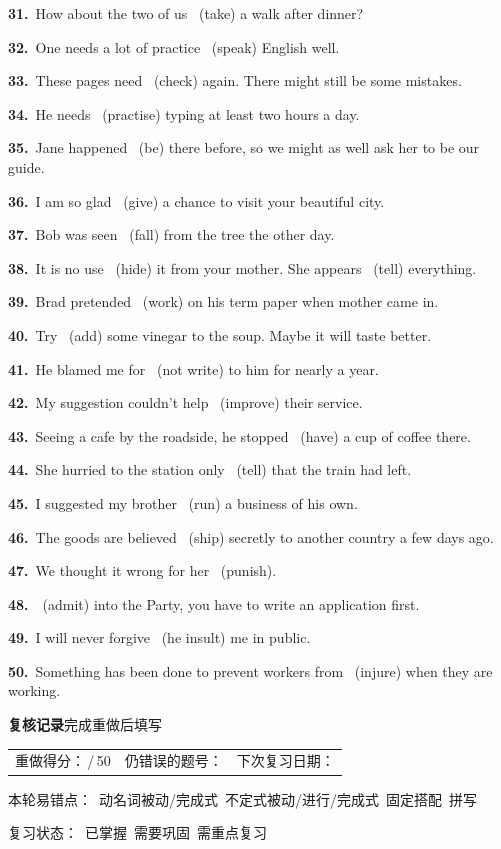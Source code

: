 \documentclass[10pt,a4paper]{article}
\newcommand{\checkmarkbox}{\fbox{\rule{0pt}{0.75ex}\rule{0.75ex}{0pt}}}
\newcommand{\STAR}{\textcolor{wrongred}{\starfont ★}}
\newcommand{\STARSLOT}[1]{\makebox[1.35em][l]{#1}}
\newcommand{\blank}{\underline{\hspace{1.8cm}}}
\newcommand{\ff}[3]{\noindent\STARSLOT{#2}\textbf{#1.}~#3\par\vspace{0.5em}}
\begin{document}
\ff{31}{}{How about the two of us \blank\ (take) a walk after dinner?}
\ff{32}{}{One needs a lot of practice \blank\ (speak) English well.}
\ff{33}{\STAR}{These pages need \blank\ (check) again. There might still be some mistakes.}
\ff{34}{}{He needs \blank\ (practise) typing at least two hours a day.}
\ff{35}{\STAR}{Jane happened \blank\ (be) there before, so we might as well ask her to be our guide.}
\ff{36}{\STAR}{I am so glad \blank\ (give) a chance to visit your beautiful city.}
\ff{37}{}{Bob was seen \blank\ (fall) from the tree the other day.}
\ff{38}{\STAR}{It is no use \blank\ (hide) it from your mother. She appears \blank\ (tell) everything.}
\ff{39}{\STAR}{Brad pretended \blank\ (work) on his term paper when mother came in.}
\ff{40}{}{Try \blank\ (add) some vinegar to the soup. Maybe it will taste better.}
\ff{41}{\STAR}{He blamed me for \blank\ (not write) to him for nearly a year.}
\ff{42}{}{My suggestion couldn't help \blank\ (improve) their service.}
\ff{43}{}{Seeing a cafe by the roadside, he stopped \blank\ (have) a cup of coffee there.}
\ff{44}{\STAR}{She hurried to the station only \blank\ (tell) that the train had left.}
\ff{45}{\STAR}{I suggested my brother \blank\ (run) a business of his own.}
\ff{46}{\STAR}{The goods are believed \blank\ (ship) secretly to another country a few days ago.}
\ff{47}{\STAR}{We thought it wrong for her \blank\ (punish).}
\ff{48}{\STAR}{\blank\ (admit) into the Party, you have to write an application first.}
\ff{49}{}{I will never forgive \blank\ (he insult) me in public.}
\ff{50}{\STAR}{Something has been done to prevent workers from \blank\ (injure) when they are working.}

\vspace{0.2em}

\vspace{0.4em}
\noindent{\color{rulegray}\rule{\textwidth}{0.5pt}}
\vspace{0.3em}
\noindent\textbf{复核记录}\hfill\small 完成重做后填写

\vspace{0.3em}
\noindent\begin{tabular}{@{}p{}@{}p{}@{}p{}@{}}
重做得分：\underline{\hspace{1.2cm}}\,/\,50
& 仍错误的题号：\underline{\hspace{3.2cm}}
& 下次复习日期：\underline{\hspace{2.0cm}} \\
\end{tabular}

\vspace{0.3em}
\noindent 本轮易错点：\checkmarkbox\ 动名词被动/完成式\quad\checkmarkbox\ 不定式被动/进行/完成式\quad\checkmarkbox\ 固定搭配\quad\checkmarkbox\ 拼写

\vspace{0.3em}
\noindent 复习状态：\checkmarkbox\ 已掌握\quad\checkmarkbox\ 需要巩固\quad\checkmarkbox\ 需重点复习
\end{document}

